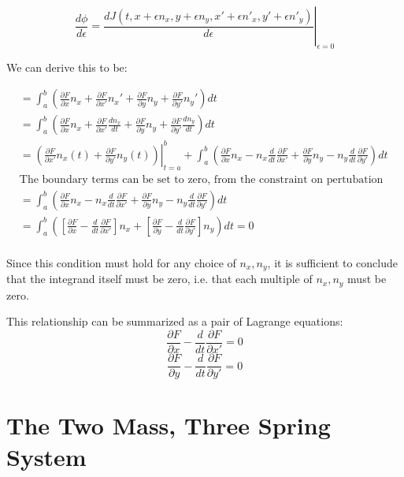 \documentclass[%
 amsmath,amssymb,
aps,
 fleqn,
 notitlepage,
]{revtex4-2}
\begin{document}
\[
    \frac{d\phi}{d\epsilon} = \left.\frac{d J(t,x+\epsilon n_x, y+\epsilon n_y,x'+\epsilon n'_x,y'+\epsilon n'_y)}{d\epsilon}\right|_{\epsilon=0}
\]

We can derive this to be:

\begin{align*}
    &= \int_a^b \left(\frac{\partial F}{\partial x}n_x + \frac{\partial F}{\partial x'}n_x' + \frac{\partial F}{\partial y}n_y + \frac{\partial F}{\partial y'}n_y'\right)dt\\
    &= \int_a^b \left(\frac{\partial F}{\partial x}n_x + \frac{\partial F}{\partial x'}\frac{d n_x}{dt} + \frac{\partial F}{\partial y}n_y + \frac{\partial F}{\partial y'}\frac{d n_y}{dt}\right)dt\\
    &= \left.\left(\frac{\partial F}{\partial x'}n_x(t) + \frac{\partial F}{\partial y'}n_y(t)\right)\right|_{t=a}^b + \int_a^b \left(\frac{\partial F}{\partial x}n_x - n_x\frac{d}{dt}\frac{\partial F}{\partial x'} + \frac{\partial F}{\partial y}n_y - n_y\frac{d}{dt}\frac{\partial F}{\partial y'}\right)dt\\
    &\text{The boundary terms can be set to zero, from the constraint on pertubation vectors:}\\
    &= \int_a^b \left(\frac{\partial F}{\partial x}n_x - n_x\frac{d}{dt}\frac{\partial F}{\partial x'} + \frac{\partial F}{\partial y}n_y - n_y\frac{d}{dt}\frac{\partial F}{\partial y'}\right)dt\\
    &= \int_a^b \left(\left[\frac{\partial F}{\partial x} - \frac{d}{dt}\frac{\partial F}{\partial x'}\right]n_x + \left[\frac{\partial F}{\partial y} - \frac{d}{dt}\frac{\partial F}{\partial y'}\right]n_y\right)dt = 0\\
\end{align*}

Since this condition must hold for any choice of $n_x,n_y$, it is sufficient to conclude that the integrand itself must be zero, i.e. that each multiple of $n_x,n_y$ must be zero.

This relationship can be summarized as a pair of Lagrange equations:
\[\frac{\partial F}{\partial x} - \frac{d}{d t}\frac{\partial F}{\partial x'}=0\]
\[\frac{\partial F}{\partial y} - \frac{d}{d t}\frac{\partial F}{\partial y'}=0\]

\section{The Two Mass, Three Spring System} %
\end{document}
